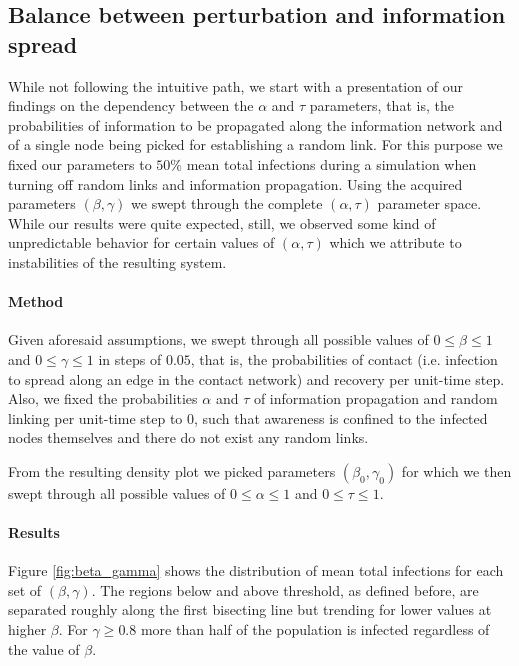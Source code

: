 \documentclass[11pt]{article}
\begin{document}
\subsection{Balance between perturbation and information spread}

While not following the intuitive path, we start with a presentation of our findings on the dependency between the $\alpha$ and $\tau$ parameters, that is, the probabilities of information to be propagated along the information network and of a single node being picked for establishing a random link. For this purpose we fixed our parameters to $50 \%$ mean total infections during a simulation when turning off random links and information propagation. Using the acquired parameters $(\beta,\gamma)$ we swept through the complete $(\alpha,\tau)$ parameter space. While our results were quite expected, still, we observed some kind of unpredictable behavior for certain values of $(\alpha,\tau)$ which we attribute to instabilities of the resulting system.

\paragraph{Method}
Given aforesaid assumptions, we swept through all possible values of $0 \leq \beta \leq 1$ and $0 \leq \gamma \leq 1$ in steps of $0.05$, that is, the probabilities of contact (i.e. infection to spread along an edge in the contact network) and recovery per unit-time step. Also, we fixed the probabilities $\alpha$ and $\tau$ of information propagation and random linking per unit-time step to $0$, such that awareness is confined to the infected nodes themselves and there do not exist any random links.

From the resulting density plot we picked parameters $(\beta_0,\gamma_0)$ for which we then swept through all possible values of $0 \leq \alpha \leq 1$ and $0 \leq \tau \leq 1$.

\paragraph{Results}

Figure \ref{fig:beta_gamma} shows the distribution of mean total infections for each set of $(\beta,\gamma)$. The regions below and above threshold, as defined before, are separated roughly along the first bisecting line but trending for lower values at higher $\beta$. For $\gamma \geq 0.8$ more than half of the population is infected regardless of the value of $\beta$.
\end{document}
